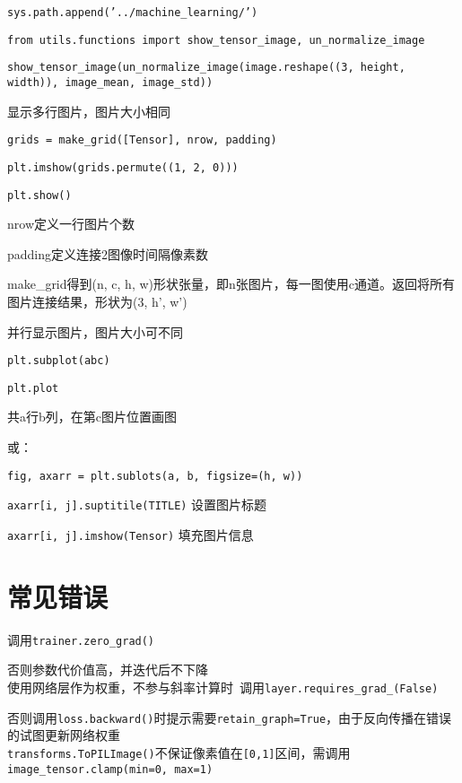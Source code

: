 \documentclass[UTF8]{ctexart}
\begin{document}
  \texttt{sys.path.append('../machine\_learning/')}

  \texttt{from utils.functions import show\_tensor\_image, un\_normalize\_image}

  \texttt{show\_tensor\_image(un\_normalize\_image(image.reshape((3, height, width)), image\_mean, image\_std))}

  显示多行图片，图片大小相同

  \quad \texttt{grids = make\_grid([Tensor], nrow, padding)}

  \quad \texttt{plt.imshow(grids.permute((1, 2, 0)))}

  \quad \texttt{plt.show()}
  
  \quad \quad nrow定义一行图片个数

  \quad \quad padding定义连接2图像时间隔像素数

  \quad \quad make\_grid得到(n, c, h, w)形状张量，即n张图片，每一图使用c通道。返回将所有图片连接结果，形状为(3, h', w')

  并行显示图片，图片大小可不同

  \quad \quad \texttt{plt.subplot(abc)}

  \quad \quad \texttt{plt.plot}

  \quad \quad \quad 共a行b列，在第c图片位置画图

  \quad 或：

  \quad \quad \texttt{fig, axarr = plt.sublots(a, b, figsize=(h, w))}

  \quad \quad \texttt{axarr[i, j].suptitile(TITLE)} 设置图片标题

  \quad \quad \texttt{axarr[i, j].imshow(Tensor)} 填充图片信息


\section{常见错误}
\noindent 调用\texttt{trainer.zero\_grad()}

  否则参数代价值高，并迭代后不下降\\
使用网络层作为权重，不参与斜率计算时\ 调用\texttt{layer.requires\_grad\_(False)}

  否则调用\texttt{loss.backward()}时提示需要\texttt{retain\_graph=True}，由于反向传播在错误的试图更新网络权重\\
\texttt{transforms.ToPILImage()}不保证像素值在\texttt{[0,1]}区间，需调用\texttt{image\_tensor.clamp(min=0, max=1)}
\end{document}
